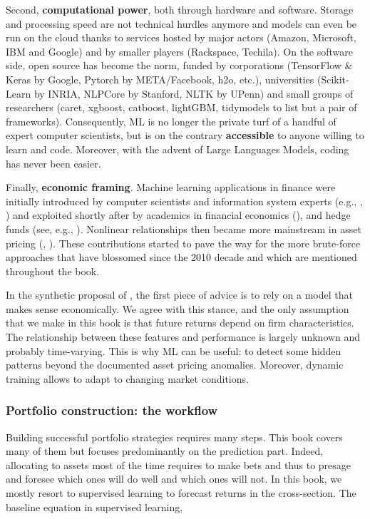 Second, \textbf{computational power}, both through hardware and software. Storage and processing speed are not technical hurdles anymore and models can even be run on the cloud thanks to services hosted by major actors (Amazon, Microsoft, IBM and Google) and by smaller players (Rackspace, Techila). On the software side, open source has become the norm, funded by corporations (TensorFlow \& Keras by Google, Pytorch by META/Facebook, h2o, etc.), universities (Scikit-Learn by INRIA, NLPCore by Stanford, NLTK by UPenn) and small groups of researchers (caret, xgboost, catboost, lightGBM, tidymodels to list but a pair of frameworks). Consequently, ML is no longer the private turf of a handful of expert computer scientists, but is on the contrary \textbf{accessible} to anyone willing to learn and code. Moreover, with the advent of Large Languages Models, coding has never been easier.

Finally, \textbf{economic framing}. Machine learning applications in finance were initially introduced by computer scientists and information system experts (e.g., \citep{braun1987predicting}, \citep{white1988economic}) and exploited shortly after by academics in financial economics (\citep{bansal1993no}), and hedge funds (see, e.g., \citep{zuckerman2019man}). Nonlinear relationships then became more mainstream in asset pricing (\citep{freeman1992nonlinear}, \citep{bansal1993new}). These contributions started to pave the way for the more brute-force approaches that have blossomed since the 2010 decade and which are mentioned throughout the book.

In the synthetic proposal of \citep{arnott2019backtesting}, the first piece of advice is to rely on a model that makes sense economically. We agree with this stance, and the only assumption that we make in this book is that future returns depend on firm characteristics. The relationship between these features and performance is largely unknown and probably time-varying. This is why ML can be useful: to detect some hidden patterns beyond the documented asset pricing anomalies. Moreover, dynamic training allows to adapt to changing market conditions.

\subsubsection{Portfolio construction: the workflow}

Building successful portfolio strategies requires many steps. This book covers many of them but focuses predominantly on the prediction part. Indeed, allocating to assets most of the time requires to make bets and thus to presage and foresee which ones will do well and which ones will not. In this book, we mostly resort to supervised learning to forecast returns in the cross-section. The baseline equation in supervised learning,

